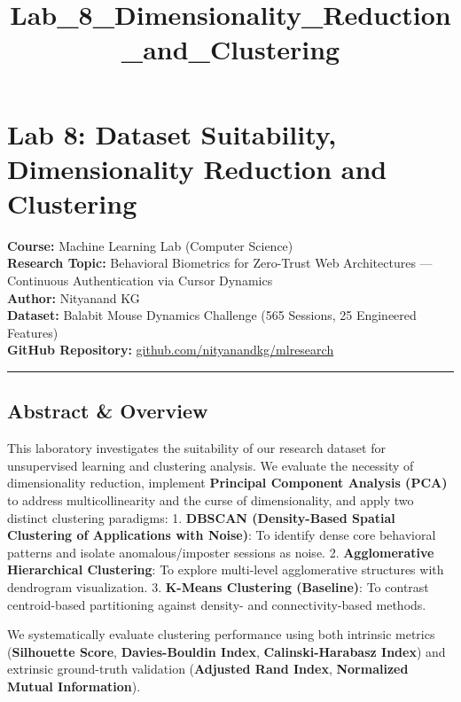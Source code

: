 \documentclass[11pt]{article}
\title{Lab\_8\_Dimensionality\_Reduction\_and\_Clustering}
\begin{document}
    
    \maketitle
    
    

    
    \section{Lab 8: Dataset Suitability, Dimensionality Reduction and
Clustering}\label{lab-8-dataset-suitability-dimensionality-reduction-and-clustering}

\textbf{Course:} Machine Learning Lab (Computer Science)\\
\textbf{Research Topic:} Behavioral Biometrics for Zero-Trust Web
Architectures --- Continuous Authentication via Cursor Dynamics\\
\textbf{Author:} Nityanand KG\\
\textbf{Dataset:} Balabit Mouse Dynamics Challenge (565 Sessions, 25
Engineered Features)\\
\textbf{GitHub Repository:}
\href{https://github.com/nityanandkg/mlresearch}{github.com/nityanandkg/mlresearch}

\begin{center}\rule{0.5\linewidth}{0.5pt}\end{center}

\subsection{Abstract \& Overview}\label{abstract-overview}

This laboratory investigates the suitability of our research dataset for
unsupervised learning and clustering analysis. We evaluate the necessity
of dimensionality reduction, implement \textbf{Principal Component
Analysis (PCA)} to address multicollinearity and the curse of
dimensionality, and apply two distinct clustering paradigms: 1.
\textbf{DBSCAN (Density-Based Spatial Clustering of Applications with
Noise)}: To identify dense core behavioral patterns and isolate
anomalous/imposter sessions as noise. 2. \textbf{Agglomerative
Hierarchical Clustering}: To explore multi-level agglomerative
structures with dendrogram visualization. 3. \textbf{K-Means Clustering
(Baseline)}: To contrast centroid-based partitioning against density-
and connectivity-based methods.

We systematically evaluate clustering performance using both intrinsic
metrics (\textbf{Silhouette Score}, \textbf{Davies-Bouldin Index},
\textbf{Calinski-Harabasz Index}) and extrinsic ground-truth validation
(\textbf{Adjusted Rand Index}, \textbf{Normalized Mutual Information}).
\end{document}
